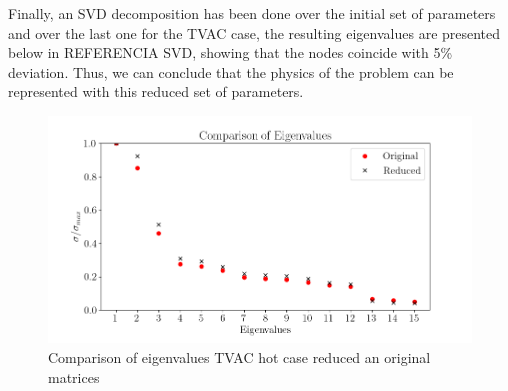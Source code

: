 Finally, an SVD decomposition has been done over the initial set of parameters and over the last one for the TVAC case, the resulting eigenvalues are presented below in REFERENCIA SVD, showing that the nodes coincide with 5\% deviation. Thus, we can conclude that the physics of the problem can be represented with this reduced set of parameters.  

\begin{figure}[H]
    \centering
    \includegraphics[width = \linewidth]{Figures/Eigenvalues.png}
    \caption{Comparison of eigenvalues TVAC hot case reduced an original matrices}
    \label{fig:SVD}
\end{figure}